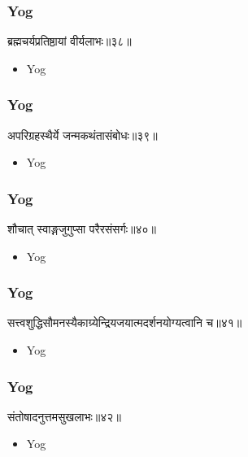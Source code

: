 \begin{frame}[fragile]\frametitle{Yog}
\begin{sanskrit}
ब्रह्मचर्यप्रतिष्ठायां वीर्यलाभः॥३८॥
\end{sanskrit}
	\begin{itemize}
	\item Yog 
	\end{itemize}
\end{frame}


\begin{frame}[fragile]\frametitle{Yog}
\begin{sanskrit}
अपरिग्रहस्थैर्ये जन्मकथंतासंबोधः॥३९॥
\end{sanskrit}
	\begin{itemize}
	\item Yog 
	\end{itemize}
\end{frame}



\begin{frame}[fragile]\frametitle{Yog}
\begin{sanskrit}
शौचात् स्वाङ्गजुगुप्सा परैरसंसर्गः॥४०॥
\end{sanskrit}
	\begin{itemize}
	\item Yog 
	\end{itemize}
\end{frame}



\begin{frame}[fragile]\frametitle{Yog}
\begin{sanskrit}
सत्त्वशुद्धिसौमनस्यैकाग्र्येन्द्रियजयात्मदर्शनयोग्यत्वानि च॥४१॥
\end{sanskrit}
	\begin{itemize}
	\item Yog 
	\end{itemize}
\end{frame}


\begin{frame}[fragile]\frametitle{Yog}
\begin{sanskrit}
संतोषादनुत्तमसुखलाभः॥४२॥
\end{sanskrit}
	\begin{itemize}
	\item Yog 
	\end{itemize}
\end{frame}


